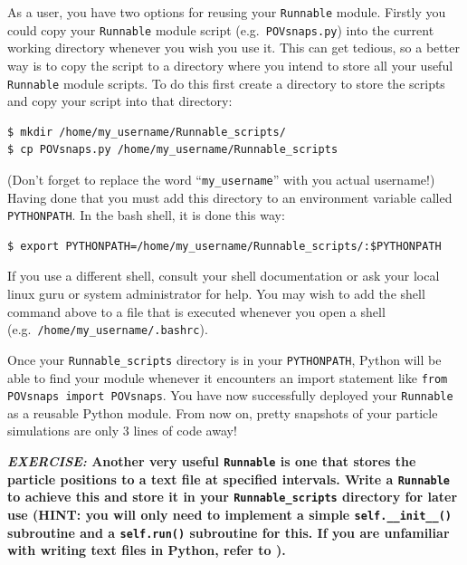 As a user, you have two options for reusing your \texttt{Runnable} module. Firstly you could copy your \texttt{Runnable} module script (e.g.\ \texttt{POVsnaps.py}) into the current working directory whenever you wish you use it. This can get tedious, so a better way is to copy the script to a directory where you intend to store all your useful \texttt{Runnable} module scripts. To do this first create a directory to store the scripts and copy your script into that directory:

\begin{verbatim}
$ mkdir /home/my_username/Runnable_scripts/
$ cp POVsnaps.py /home/my_username/Runnable_scripts
\end{verbatim}

\noindent 
(Don't forget to replace the word ``\texttt{my\_username}'' with you actual username!) Having done that you must add this directory to an environment variable called \texttt{PYTHONPATH}. In the bash shell, it is done this way:

\begin{verbatim}
$ export PYTHONPATH=/home/my_username/Runnable_scripts/:$PYTHONPATH
\end{verbatim}

\noindent
If you use a different shell, consult your shell documentation or ask your local linux guru or system administrator for help. You may wish to add the shell command above to a file that is executed whenever you open a shell (e.g.\ \texttt{/home/my\_username/.bashrc}).

Once your \texttt{Runnable\_scripts} directory is in your \texttt{PYTHONPATH}, Python will be able to find your module whenever it encounters an import statement like \texttt{from POVsnaps import POVsnaps}. You have now successfully deployed your \texttt{Runnable} as a reusable Python module. From now on, pretty snapshots of your particle simulations are only 3 lines of code away!

\vskip 5mm
\noindent \textbf{\emph{EXERCISE:} Another very useful \texttt{Runnable} is one that stores the particle positions to a text file at specified intervals. Write a \texttt{Runnable} to achieve this and store it in your \texttt{Runnable\_scripts} directory for later use (HINT: you will only need to implement a simple \texttt{self.\_\_init\_\_()} subroutine and a \texttt{self.run()} subroutine for this. If you are unfamiliar with writing text files in Python, refer to ).}

